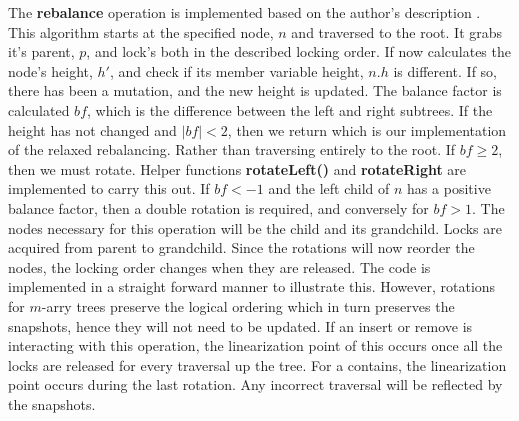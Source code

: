 \documentclass[conference]{IEEEtran}
\makeatletter
\theoremstyle{definition}
\theoremstyle{theorem}
\newenvironment{breakablealgorithm}
  {%
   \begin{center}
     \refstepcounter{algorithm}%
     \hrule height.8pt depth0pt \kern2pt%
     \renewcommand{\caption}[2][\relax]{%
       {\raggedright\textbf{\ALG@name~\thealgorithm} ##2\par}%
       \ifx\relax##1\relax %
         \addcontentsline{loa}{algorithm}{\protect\numberline{\thealgorithm}##2}%
       \else %
         \addcontentsline{loa}{algorithm}{\protect\numberline{\thealgorithm}##1}%
       \fi
       \kern2pt\hrule\kern2pt
     }
  }{%
     \kern2pt\hrule\relax%
   \end{center}
  }
\makeatother
\begin{document}
The \textbf{rebalance} operation is implemented based on the author's description \cite{pavt}. This algorithm starts at the specified node, $n$ and traversed to the root. It grabs it's parent, $p$, and lock's both in the described locking order. If now calculates the node's height, $h'$, and check if its member variable height, $n.h$ is different. If so, there has been a mutation, and the new height is updated. The balance factor is calculated $bf$, which is the difference between the left and right subtrees. If the height has not changed and $|bf|<2$, then we return which is our implementation of the relaxed rebalancing. Rather than traversing entirely to the root. If $bf\geq 2$, then we must rotate. Helper functions \textbf{rotateLeft()} and \textbf{rotateRight} are implemented to carry this out. If $bf<-1$ and the left child of $n$ has a positive balance factor, then a double rotation is required, and conversely for $bf>1$. The nodes necessary for this operation will be the child and its grandchild. Locks are acquired from parent to grandchild. Since the rotations will now reorder the nodes, the locking order changes when they are released. The code is implemented in a straight forward manner to illustrate this. However, rotations for $m$-arry trees preserve the logical ordering which in turn preserves the snapshots, hence they will not need to be updated. If an insert or remove is interacting with this operation, the linearization point of this occurs once all the locks are released for every traversal up the tree. For a contains, the linearization point occurs during the last rotation. Any incorrect traversal will be reflected by the snapshots.
%
\end{document}
